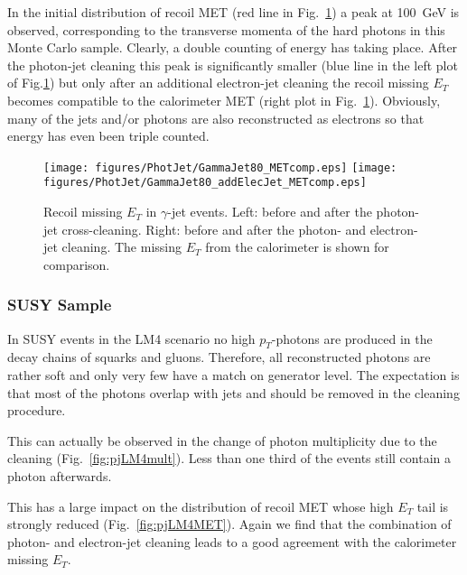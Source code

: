 \documentclass{cmspaper}
\begin{document}
In the initial distribution of recoil MET (red line in
Fig.~\ref{fig:pjMET}) a peak at 100\ GeV is observed, corresponding to the
transverse momenta of the hard photons in this Monte Carlo sample. Clearly, a
double counting of energy has taking place.  After the photon-jet cleaning this
peak is significantly smaller (blue line in the left plot of
Fig.\ref{fig:pjMET}) but only after an additional electron-jet cleaning the
recoil missing $E_T$ becomes compatible to the calorimeter MET (right plot in
Fig.~\ref{fig:pjMET}). Obviously, many of the jets and/or photons are
also reconstructed as electrons so that energy has even been triple counted.
\begin{figure}[hbtp]
  \begin{center}
    \texttt{[image: figures/PhotJet/GammaJet80\_METcomp.eps]}
    \texttt{[image: figures/PhotJet/GammaJet80\_addElecJet\_METcomp.eps]}
    \caption{Recoil missing $E_T$ in $\gamma$-jet events. Left: before and
    after the photon-jet cross-cleaning. Right: before and after the photon-
    and electron-jet cleaning. The missing $E_T$ from the calorimeter is shown
    for comparison.}
    \label{fig:pjMET}
  \end{center}
\end{figure}

\clearpage
\subsubsection{SUSY Sample}
In SUSY events in the LM4 scenario no high $p_T$-photons are produced in the
decay chains of squarks and gluons. Therefore, all reconstructed photons are rather soft and only very
few have a match on generator level. The expectation is that most of the
photons overlap with jets and should be removed in the cleaning procedure.

This can actually be observed in the change of photon multiplicity due to the
cleaning (Fig.~\ref{fig:pjLM4mult}). Less than one third of the events still
contain a photon afterwards.

This has a large impact on the distribution of recoil MET whose high $E_T$ tail
is strongly reduced (Fig.~\ref{fig:pjLM4MET}). Again we find that the
combination of photon- and electron-jet cleaning leads to a good agreement with
the calorimeter missing $E_T$.
\end{document}
